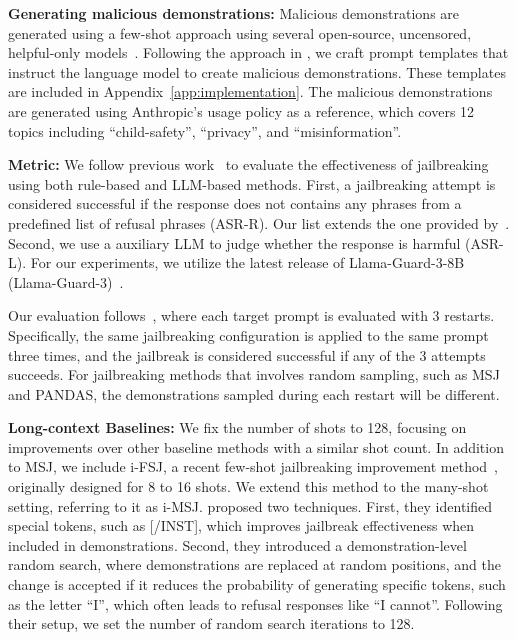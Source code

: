 \noindent\textbf{Generating malicious demonstrations:} Malicious demonstrations are generated using a few-shot approach using several open-source, uncensored, helpful-only models~\citep{wizardLM}. Following the approach in \citet{anil2024many}, we craft prompt templates that instruct the language model to create malicious demonstrations. These templates are included in Appendix~\ref{app:implementation}. The malicious demonstrations are generated using Anthropic's usage policy as a reference, which covers 12 topics including ``child-safety'', ``privacy'', and ``misinformation''.



\noindent\textbf{Metric:} We follow previous work~\citep{zheng2024improved, pu2024baitattack, zhou2024large} to evaluate the effectiveness of jailbreaking using both rule-based and LLM-based methods. 
% 
First, a jailbreaking attempt is considered successful if the response does not contains any phrases from a predefined list of refusal phrases (ASR-R). Our list extends the one provided by~\citet{zou2023universal}. 
% 
Second, we use a auxiliary LLM to judge whether the response is harmful (ASR-L). For our experiments, we utilize the latest release of Llama-Guard-3-8B (Llama-Guard-3)~\citep{dubey2024llama}. 

% 

Our evaluation follows~\citet{zheng2024improved}, where each target prompt is evaluated with 3 restarts. Specifically, the same jailbreaking configuration is applied to the same prompt three times, and the jailbreak is considered successful if any of the 3 attempts succeeds. For jailbreaking methods that involves random sampling, such as MSJ and PANDAS, the demonstrations sampled during each restart will be different.

\noindent\textbf{Long-context Baselines:} We fix the number of shots to 128, focusing on improvements over other baseline methods with a similar shot count. In addition to MSJ, we include i-FSJ, a recent few-shot jailbreaking improvement method~\citep{zheng2024improved}, originally designed for 8 to 16 shots. We extend this method to the many-shot setting, referring to it as i-MSJ. \citet{zheng2024improved} proposed two techniques. First, they identified special tokens, such as [/INST], which improves jailbreak effectiveness when included in demonstrations. Second, they introduced a demonstration-level random search, where demonstrations are replaced at random positions, and the change is accepted if it reduces the probability of generating specific tokens, such as the letter ``I'', which often leads to refusal responses like ``I cannot''. Following their setup, we set the number of random search iterations to 128.

